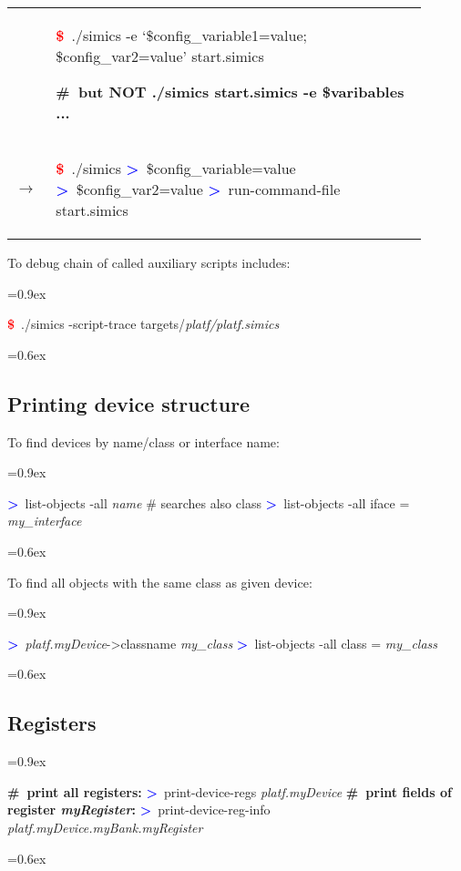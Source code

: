 \documentclass[8pt]{extarticle}
\newenvironment{code}[1][]{%
\begin{prebox}[#1]\obeylines%
\fontdimen2\font=0.9ex%
}{%
\end{prebox}%
\fontdimen2\font=0.6ex%
}
\newenvironment{codem}[1][\linewidth]{%
\begin{minipage}{#1}%
\begin{prebox}\obeylines}{%
\end{prebox}%
\end{minipage}}
\newenvironment{code9}{\begin{codem}[0.9\linewidth]}{\end{codem}}
\newcommand{\cod}[1]{\colorbox{green!15}{#1}}
\newcommand{\ind}{\hphantom{~~~}}
\newcommand{\prompt}{\textcolor{red}{\textbf{\$}\ }}
\newcommand{\sprompt}{\textcolor{blue}{\textbf{>}\ }}
\newcommand{\cmtcommon}[1]{\textcolor{Sepia}{\textbf{#1}}}
\newcommand{\cmt}[1]{\cmtcommon{\#\ #1}}
\newcommand{\p}[1]{\textit{\large#1}}
\begin{document}
\begin{multicols*}{3}
\begin{tabular}{lp{0.9\linewidth}}
        & \begin{code9}
            \prompt ./simics -e ‘\$config\_variable1=value; \$config\_var2=value’ start.simics

            \cmt{but NOT ./simics start.simics -e \$varibables ...}
        \end{code9}
        \vspace{0.05cm}
        \\
        $\longrightarrow$ &
        \begin{code9}
            \prompt ./simics
            \sprompt \$config\_variable=value
            \sprompt \$config\_var2=value
            \sprompt run-command-file start.simics
        \end{code9}
    \end{tabular}


    To debug chain of called auxiliary scripts \cod{include}s:
    \begin{code}
        \prompt ./simics -script-trace targets/\p{platf/platf.simics}
    \end{code}

\subsection{Printing device structure}
To find devices by name/class or interface name:
    \begin{code}
        \sprompt list-objects -all \p{name} \ind \# searches also class
        \sprompt list-objects -all iface = \p{my\_interface}
    \end{code}

To find all objects with the same class as given device:
        \begin{code}
            \sprompt \p{platf.myDevice}->classname
            \p{my\_class}
            \sprompt list-objects -all class = \p{my\_class}
        \end{code}

\subsection{Registers}
\begin{code}
    \cmt{print all registers:}
    \sprompt print-device-regs \p{platf.myDevice}
    \cmt{print fields of register \p{myRegister}:}
    \sprompt print-device-reg-info \p{platf.myDevice.myBank.myRegister}
\end{code}


\end{multicols*}
\end{document}
